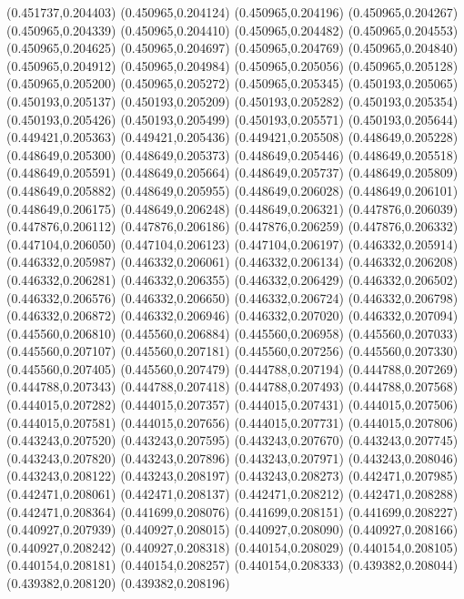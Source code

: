 (0.451737,0.204403)
(0.450965,0.204124)
(0.450965,0.204196)
(0.450965,0.204267)
(0.450965,0.204339)
(0.450965,0.204410)
(0.450965,0.204482)
(0.450965,0.204553)
(0.450965,0.204625)
(0.450965,0.204697)
(0.450965,0.204769)
(0.450965,0.204840)
(0.450965,0.204912)
(0.450965,0.204984)
(0.450965,0.205056)
(0.450965,0.205128)
(0.450965,0.205200)
(0.450965,0.205272)
(0.450965,0.205345)
(0.450193,0.205065)
(0.450193,0.205137)
(0.450193,0.205209)
(0.450193,0.205282)
(0.450193,0.205354)
(0.450193,0.205426)
(0.450193,0.205499)
(0.450193,0.205571)
(0.450193,0.205644)
(0.449421,0.205363)
(0.449421,0.205436)
(0.449421,0.205508)
(0.448649,0.205228)
(0.448649,0.205300)
(0.448649,0.205373)
(0.448649,0.205446)
(0.448649,0.205518)
(0.448649,0.205591)
(0.448649,0.205664)
(0.448649,0.205737)
(0.448649,0.205809)
(0.448649,0.205882)
(0.448649,0.205955)
(0.448649,0.206028)
(0.448649,0.206101)
(0.448649,0.206175)
(0.448649,0.206248)
(0.448649,0.206321)
(0.447876,0.206039)
(0.447876,0.206112)
(0.447876,0.206186)
(0.447876,0.206259)
(0.447876,0.206332)
(0.447104,0.206050)
(0.447104,0.206123)
(0.447104,0.206197)
(0.446332,0.205914)
(0.446332,0.205987)
(0.446332,0.206061)
(0.446332,0.206134)
(0.446332,0.206208)
(0.446332,0.206281)
(0.446332,0.206355)
(0.446332,0.206429)
(0.446332,0.206502)
(0.446332,0.206576)
(0.446332,0.206650)
(0.446332,0.206724)
(0.446332,0.206798)
(0.446332,0.206872)
(0.446332,0.206946)
(0.446332,0.207020)
(0.446332,0.207094)
(0.445560,0.206810)
(0.445560,0.206884)
(0.445560,0.206958)
(0.445560,0.207033)
(0.445560,0.207107)
(0.445560,0.207181)
(0.445560,0.207256)
(0.445560,0.207330)
(0.445560,0.207405)
(0.445560,0.207479)
(0.444788,0.207194)
(0.444788,0.207269)
(0.444788,0.207343)
(0.444788,0.207418)
(0.444788,0.207493)
(0.444788,0.207568)
(0.444015,0.207282)
(0.444015,0.207357)
(0.444015,0.207431)
(0.444015,0.207506)
(0.444015,0.207581)
(0.444015,0.207656)
(0.444015,0.207731)
(0.444015,0.207806)
(0.443243,0.207520)
(0.443243,0.207595)
(0.443243,0.207670)
(0.443243,0.207745)
(0.443243,0.207820)
(0.443243,0.207896)
(0.443243,0.207971)
(0.443243,0.208046)
(0.443243,0.208122)
(0.443243,0.208197)
(0.443243,0.208273)
(0.442471,0.207985)
(0.442471,0.208061)
(0.442471,0.208137)
(0.442471,0.208212)
(0.442471,0.208288)
(0.442471,0.208364)
(0.441699,0.208076)
(0.441699,0.208151)
(0.441699,0.208227)
(0.440927,0.207939)
(0.440927,0.208015)
(0.440927,0.208090)
(0.440927,0.208166)
(0.440927,0.208242)
(0.440927,0.208318)
(0.440154,0.208029)
(0.440154,0.208105)
(0.440154,0.208181)
(0.440154,0.208257)
(0.440154,0.208333)
(0.439382,0.208044)
(0.439382,0.208120)
(0.439382,0.208196)
